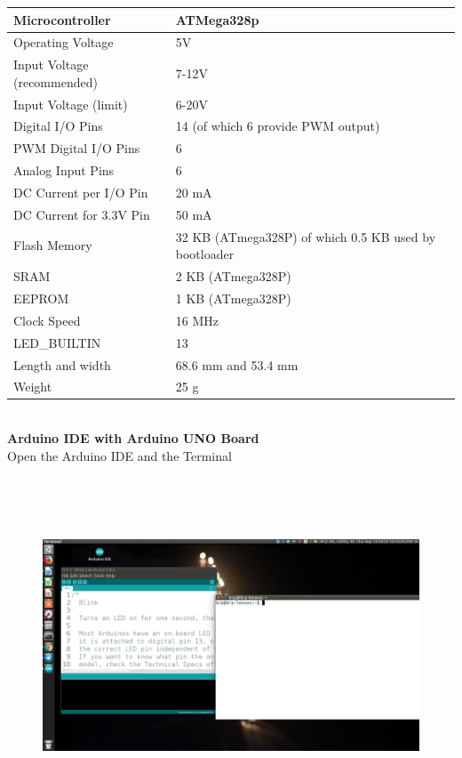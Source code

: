 \documentclass[12pt,a4paper]{article}
\begin{document}
\begin{table}[h!]
\begin{tabular}{|l|l|}
\hline
Microcontroller & ATMega328p \\ \hline
Operating Voltage & 5V \\ \hline
Input Voltage (recommended) & 7-12V \\ \hline
Input Voltage (limit) & 6-20V \\ \hline
Digital I/O Pins & 14 (of which 6 provide PWM output) \\ \hline
PWM Digital I/O Pins & 6 \\ \hline
Analog Input Pins & 6 \\ \hline
DC Current per I/O Pin & 20 mA \\ \hline
DC Current for 3.3V Pin & 50 mA \\ \hline
Flash Memory & 32 KB (ATmega328P) of which 0.5 KB used by bootloader \\ \hline
SRAM & 2 KB (ATmega328P) \\ \hline
EEPROM & 1 KB (ATmega328P) \\ \hline
Clock Speed & 16 MHz \\ \hline
LED\_BUILTIN & 13 \\ \hline
Length and width & 68.6 mm and 53.4 mm \\ \hline
Weight & 25 g \\ \hline
\end{tabular}
\end{table}
\\
\textbf{Arduino IDE with Arduino UNO Board}\\
Open the Arduino IDE and the Terminal 
\begin{figure}[h!]
    \centering
	\includegraphics[width=15cm, height=10cm]{Introduction/3.png}
\end{figure}
\end{document}
